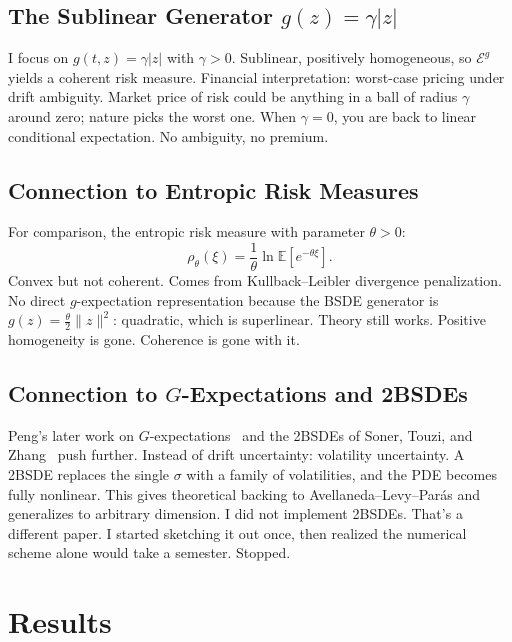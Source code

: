 \documentclass[11pt]{article}
\theoremstyle{definition}
\theoremstyle{remark}
\newcommand{\E}{\mathbb{E}}
\newcommand{\norm}[1]{\lVert #1 \rVert}
\newcommand{\abs}[1]{\lvert #1 \rvert}
\begin{document}
\subsection{The Sublinear Generator $g(z) = \gamma|z|$}

I focus on $g(t, z) = \gamma \abs{z}$ with $\gamma > 0$.
Sublinear, positively homogeneous, so $\mathcal{E}^g$ yields a
coherent risk measure. Financial interpretation: worst-case
pricing under drift ambiguity. Market price of risk could be
anything in a ball of radius $\gamma$ around zero; nature picks
the worst one. When $\gamma = 0$, you are back to linear
conditional expectation. No ambiguity, no premium.

\subsection{Connection to Entropic Risk Measures}

For comparison, the entropic risk measure with parameter $\theta > 0$:
\begin{equation}\label{eq:entropic}
  \rho_\theta(\xi) = \frac{1}{\theta}\ln \E\!\left[e^{-\theta\xi}\right].
\end{equation}
Convex but not coherent. Comes from Kullback--Leibler divergence
penalization. No direct $g$-expectation representation because the
BSDE generator is $g(z) = \frac{\theta}{2}\norm{z}^2$: quadratic,
which is superlinear. Theory still works. Positive homogeneity is
gone. Coherence is gone with it.

\subsection{Connection to $G$-Expectations and 2BSDEs}

Peng's later work on $G$-expectations~\cite{peng2019nonlinear} and
the 2BSDEs of Soner, Touzi, and
Zhang~\cite{sonertouziizhang2012wellposedness} push further.
Instead of drift uncertainty: volatility uncertainty.
A 2BSDE replaces the single $\sigma$ with a family of volatilities,
and the PDE becomes fully nonlinear.
This gives theoretical backing to Avellaneda--Levy--Par\'{a}s and
generalizes to arbitrary dimension.
I did not implement 2BSDEs. That's a different paper.
I started sketching it out once, then realized the numerical scheme
alone would take a semester. Stopped.


\section{Results}\label{sec:results}
\end{document}
